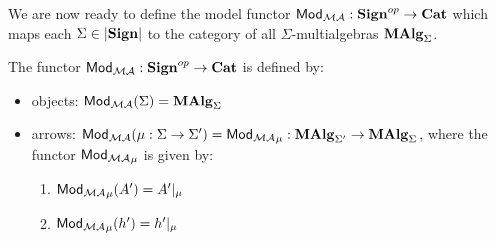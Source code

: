 We are now ready to define the model functor ${\sf {Mod_{{\mathcal{MA}}}}}:{\bf Sign}^{op}\to{\bf Cat}$ which
maps each $\Sigma\in|{\bf Sign}|$ to the category of all $\Sigma$-multialgebras ${\bf MAlg}_{\Sigma}$.
 
\begin{definition}\label{de:MAlg}
The functor ${\sf {Mod_{{\mathcal{MA}}}}}: {\bf Sign}^{op} \to {\bf Cat}$ is defined by:
\begin{itemize}\MyLPar
\item objects: ${\sf {Mod_{{\mathcal{MA}}}}}(\Sigma) = {\bf MAlg}_{\Sigma}$
\item arrows: ${\sf {Mod_{{\mathcal{MA}}}}}(\mu:\Sigma \to \Sigma') = {\sf {Mod_{{\mathcal{MA}}}}}_\mu :
{\bf MAlg}_{\Sigma'} \to {\bf MAlg}_{\Sigma}$, where the functor ${\sf {Mod_{{\mathcal{MA}}}}}_\mu$ is given by:
	\begin{enumerate}\MyLPar
	\item ${\sf {Mod_{{\mathcal{MA}}}}}_\mu(A') = A'|_\mu$
	\item ${\sf {Mod_{{\mathcal{MA}}}}}_\mu(h') = h'|_\mu$
	\end{enumerate}
\end{itemize}
\end{definition}

